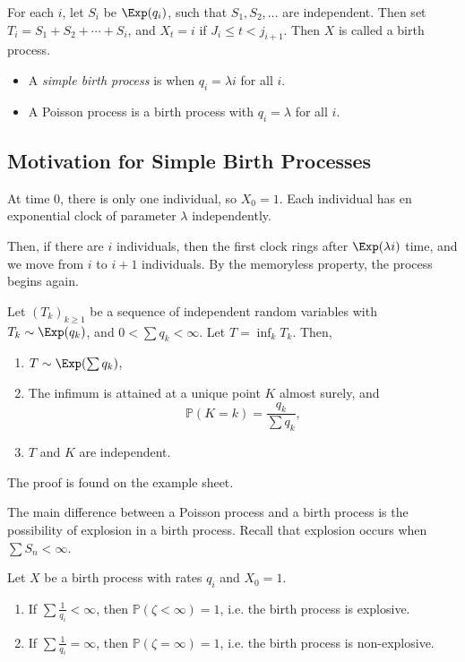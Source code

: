 \documentclass[12pt]{article}
\begin{document}
For each $i$, let $S_i$ be $\Exp(q_i)$, such that $S_1, S_2, \ldots$ are independent. Then set $T_i = S_1 + S_2 + \cdots + S_i$, and $X_t = i$ if $J_i \leq t < j_{i+1}$. Then $X$ is called a birth process.

\begin{itemize}
	\item A \emph{simple birth process} is when $q_i = \lambda i$ for all $i$.
	\item A Poisson process is a birth process with $q_i = \lambda$ for all $i$.
\end{itemize}

\subsection{Motivation for Simple Birth Processes}
\label{sub:motivation_for_simple_birth_processes}

At time 0, there is only one individual, so $X_0 = 1$. Each individual has en exponential clock of parameter $\lambda$ independently.

Then, if there are $i$ individuals, then the first clock rings after $\Exp(\lambda i)$ time, and we move from $i$ to $i+1$ individuals. By the memoryless property, the process begins again.

\begin{proposition}
	Let $(T_k)_{k \geq 1}$ be a sequence of independent random variables with $T_k \sim \Exp(q_k)$, and $0 < \sum q_k < \infty$. Let $T = \inf_{k} T_k$. Then,
	\begin{enumerate}[\normalfont(a)]
		\item $T \sim \Exp(\sum q_k)$,
		\item The infimum is attained at a unique point $K$ almost surely, and
			\[
			\mathbb{P}(K = k) = \frac{q_k}{\sum q_k}
			,\]
		\item $T$ and $K$ are independent.
	\end{enumerate}
\end{proposition}

The proof is found on the example sheet.

The main difference between a Poisson process and a birth process is the possibility of explosion in a birth process. Recall that explosion occurs when $\sum S_n < \infty$.

\begin{proposition}
	Let $X$ be a birth process with rates $q_i$ and $X_0 = 1$.
	\begin{enumerate}[\normalfont1.]
		\item If $\sum \frac{1}{q_i} < \infty$, then $\mathbb{P}(\zeta<\infty) = 1$, i.e. the birth process is explosive.
		\item If $\sum \frac{1}{q_i} = \infty$, then $\mathbb{P}(\zeta = \infty) = 1$, i.e. the birth process is non-explosive.
	\end{enumerate}
\end{proposition}
\end{document}
